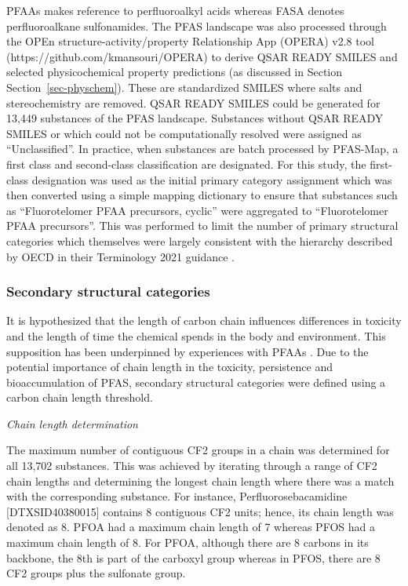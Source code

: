 \documentclass[
  super,
  preprint,
  3p]{elsarticle}
\begin{document}
PFAAs makes reference to perfluoroalkyl acids whereas FASA denotes
perfluoroalkane sulfonamides. The PFAS landscape was also processed
through the OPEn structure-activity/property Relationship App (OPERA)
v2.8 tool \citep{mansouri_opera_2018}
(https://github.com/kmansouri/OPERA) to derive QSAR READY SMILES and
selected physicochemical property predictions (as discussed in Section
Section~\ref{sec-physchem}). These are standardized SMILES where salts
and stereochemistry are removed. QSAR READY SMILES could be generated
for 13,449 substances of the PFAS landscape. Substances without QSAR
READY SMILES or which could not be computationally resolved were
assigned as ``Unclassified''. In practice, when substances are batch
processed by PFAS-Map, a first class and second-class classification are
designated. For this study, the first-class designation was used as the
initial primary category assignment which was then converted using a
simple mapping dictionary to ensure that substances such as
``Fluorotelomer PFAA precursors, cyclic'' were aggregated to
``Fluorotelomer PFAA precursors''. This was performed to limit the
number of primary structural categories which themselves were largely
consistent with the hierarchy described by OECD in their Terminology
2021 guidance \citep{oecd_reconciling_2021}.

\hypertarget{secondary-structural-categories}{%
\subsubsection{Secondary structural
categories}\label{secondary-structural-categories}}

It is hypothesized that the length of carbon chain influences
differences in toxicity and the length of time the chemical spends in
the body and environment. This supposition has been underpinned by
experiences with PFAAs
\citep{chambers_review_2021, sznajder-katarzynska_review_2019}. Due to
the potential importance of chain length in the toxicity, persistence
and bioaccumulation of PFAS, secondary structural categories were
defined using a carbon chain length threshold.

\emph{Chain length determination}

The maximum number of contiguous CF2 groups in a chain was determined
for all 13,702 substances. This was achieved by iterating through a
range of CF2 chain lengths and determining the longest chain length
where there was a match with the corresponding substance. For instance,
Perfluorosebacamidine {[}DTXSID40380015{]} contains 8 contiguous CF2
units; hence, its chain length was denoted as 8. PFOA had a maximum
chain length of 7 whereas PFOS had a maximum chain length of 8. For
PFOA, although there are 8 carbons in its backbone, the 8th is part of
the carboxyl group whereas in PFOS, there are 8 CF2 groups plus the
sulfonate group.
\end{document}
